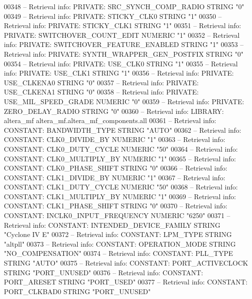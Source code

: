 \begin{DoxyCode}
{00348 \textcolor{keyword}{-- Retrieval info: PRIVATE: SRC\_SYNCH\_COMP\_RADIO STRING "0"}
00349 \textcolor{keyword}{-- Retrieval info: PRIVATE: STICKY\_CLK0 STRING "1"}
00350 \textcolor{keyword}{-- Retrieval info: PRIVATE: STICKY\_CLK1 STRING "1"}
00351 \textcolor{keyword}{-- Retrieval info: PRIVATE: SWITCHOVER\_COUNT\_EDIT NUMERIC "1"}
00352 \textcolor{keyword}{-- Retrieval info: PRIVATE: SWITCHOVER\_FEATURE\_ENABLED STRING "1"}
00353 \textcolor{keyword}{-- Retrieval info: PRIVATE: SYNTH\_WRAPPER\_GEN\_POSTFIX STRING "0"}
00354 \textcolor{keyword}{-- Retrieval info: PRIVATE: USE\_CLK0 STRING "1"}
00355 \textcolor{keyword}{-- Retrieval info: PRIVATE: USE\_CLK1 STRING "1"}
00356 \textcolor{keyword}{-- Retrieval info: PRIVATE: USE\_CLKENA0 STRING "0"}
00357 \textcolor{keyword}{-- Retrieval info: PRIVATE: USE\_CLKENA1 STRING "0"}
00358 \textcolor{keyword}{-- Retrieval info: PRIVATE: USE\_MIL\_SPEED\_GRADE NUMERIC "0"}
00359 \textcolor{keyword}{-- Retrieval info: PRIVATE: ZERO\_DELAY\_RADIO STRING "0"}
00360 \textcolor{keyword}{-- Retrieval info: LIBRARY: altera\_mf altera\_mf.altera\_mf\_components.all}
00361 \textcolor{keyword}{-- Retrieval info: CONSTANT: BANDWIDTH\_TYPE STRING "AUTO"}
00362 \textcolor{keyword}{-- Retrieval info: CONSTANT: CLK0\_DIVIDE\_BY NUMERIC "1"}
00363 \textcolor{keyword}{-- Retrieval info: CONSTANT: CLK0\_DUTY\_CYCLE NUMERIC "50"}
00364 \textcolor{keyword}{-- Retrieval info: CONSTANT: CLK0\_MULTIPLY\_BY NUMERIC "1"}
00365 \textcolor{keyword}{-- Retrieval info: CONSTANT: CLK0\_PHASE\_SHIFT STRING "0"}
00366 \textcolor{keyword}{-- Retrieval info: CONSTANT: CLK1\_DIVIDE\_BY NUMERIC "1"}
00367 \textcolor{keyword}{-- Retrieval info: CONSTANT: CLK1\_DUTY\_CYCLE NUMERIC "50"}
00368 \textcolor{keyword}{-- Retrieval info: CONSTANT: CLK1\_MULTIPLY\_BY NUMERIC "1"}
00369 \textcolor{keyword}{-- Retrieval info: CONSTANT: CLK1\_PHASE\_SHIFT STRING "0"}
00370 \textcolor{keyword}{-- Retrieval info: CONSTANT: INCLK0\_INPUT\_FREQUENCY NUMERIC "6250"}
00371 \textcolor{keyword}{-- Retrieval info: CONSTANT: INTENDED\_DEVICE\_FAMILY STRING "Cyclone IV E"}
00372 \textcolor{keyword}{-- Retrieval info: CONSTANT: LPM\_TYPE STRING "altpll"}
00373 \textcolor{keyword}{-- Retrieval info: CONSTANT: OPERATION\_MODE STRING "NO\_COMPENSATION"}
00374 \textcolor{keyword}{-- Retrieval info: CONSTANT: PLL\_TYPE STRING "AUTO"}
00375 \textcolor{keyword}{-- Retrieval info: CONSTANT: PORT\_ACTIVECLOCK STRING "PORT\_UNUSED"}
00376 \textcolor{keyword}{-- Retrieval info: CONSTANT: PORT\_ARESET STRING "PORT\_USED"}
00377 \textcolor{keyword}{-- Retrieval info: CONSTANT: PORT\_CLKBAD0 STRING "PORT\_UNUSED"}
}
\end{DoxyCode}
